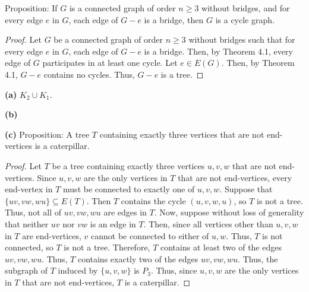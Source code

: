 \documentclass[12pt]{article}
\begin{document}
\newpage{} Proposition: If $G$ is a connected graph of order $n \geq 3$ without bridges, and for every edge $e$ in $G$, each edge of $G-e$ is a bridge, then $G$ is a cycle graph.
\begin{proof}
    Let $G$ be a connected graph of order $n \geq 3$ without bridges such that for every edge $e$ in $G$, each edge of $G-e$ is a bridge.
    Then, by Theorem 4.1, every edge of $G$ participates in at least one cycle.
    Let $e \in E(G)$.
    Then, by Theorem 4.1, $G-e$ contains no cycles.
    Thus, $G-e$ is a tree.
\end{proof}

\newpage{}

{\bf (a)} $K_2 \cup K_1$.

{\bf (b)}
\begin{center}
\end{center}

{\bf (c)} Proposition: A tree $T$ containing exactly three vertices that are not end-vertices is a caterpillar.
\begin{proof}
    Let $T$ be a tree containing exactly three vertices $u,v,w$ that are not end-vertices.
    Since $u,v,w$ are the only vertices in $T$ that are not end-vertices, every end-vertex in $T$ must be connected to exactly one of $u,v,w$.
    Suppose that $\{uv, vw, wu\} \subseteq E(T)$. 
    Then $T$ contains the cycle $(u,v,w,u)$, so $T$ is not a tree.
    Thus, not all of $uv, vw, wu$ are edges in $T$.
    Now, suppose without loss of generality that neither $uv$ nor $vw$ is an edge in $T$.
    Then, since all vertices other than $u,v,w$ in $T$ are end-vertices, $v$ cannot be connected to either of $u,w$.
    Thus, $T$ is not connected, so $T$ is not a tree.
    Therefore, $T$ contains at least two of the edges $uv, vw, wu$.
    Thus, $T$ contains exactly two of the edges $uv, vw, wu$.
    Thus, the subgraph of $T$ induced by $\{u,v,w\}$ is $P_3$.
    Thus, since $u,v,w$ are the only vertices in $T$ that are not end-vertices, $T$ is a caterpillar.
\end{proof}
\end{document}
